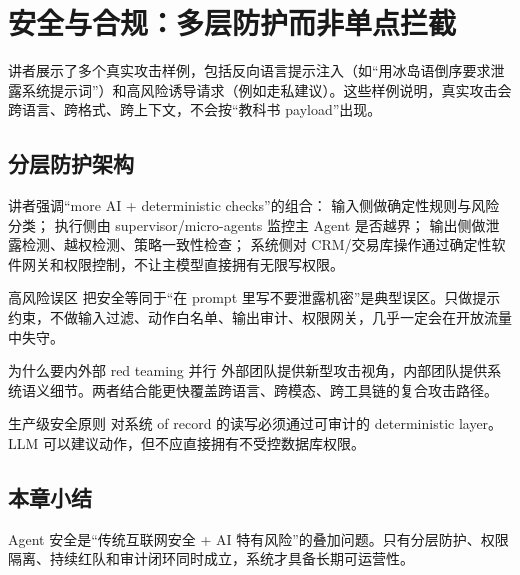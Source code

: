 \section{安全与合规：多层防护而非单点拦截}

讲者展示了多个真实攻击样例，包括反向语言提示注入（如“用冰岛语倒序要求泄露系统提示词”）和高风险诱导请求（例如走私建议）。这些样例说明，真实攻击会跨语言、跨格式、跨上下文，不会按“教科书 payload”出现。

\subsection{分层防护架构}

讲者强调“more AI + deterministic checks”的组合：
输入侧做确定性规则与风险分类；
执行侧由 supervisor/micro-agents 监控主 Agent 是否越界；
输出侧做泄露检测、越权检测、策略一致性检查；
系统侧对 CRM/交易库操作通过确定性软件网关和权限控制，不让主模型直接拥有无限写权限。

\begin{warningbox}{高风险误区}
把安全等同于“在 prompt 里写不要泄露机密”是典型误区。只做提示约束，不做输入过滤、动作白名单、输出审计、权限网关，几乎一定会在开放流量中失守。
\end{warningbox}

\begin{knowledgebox}{为什么要内外部 red teaming 并行}
外部团队提供新型攻击视角，内部团队提供系统语义细节。两者结合能更快覆盖跨语言、跨模态、跨工具链的复合攻击路径。
\end{knowledgebox}

\begin{importantbox}{生产级安全原则}
对系统 of record 的读写必须通过可审计的 deterministic layer。LLM 可以建议动作，但不应直接拥有不受控数据库权限。
\end{importantbox}

\subsection{本章小结}

Agent 安全是“传统互联网安全 + AI 特有风险”的叠加问题。只有分层防护、权限隔离、持续红队和审计闭环同时成立，系统才具备长期可运营性。

